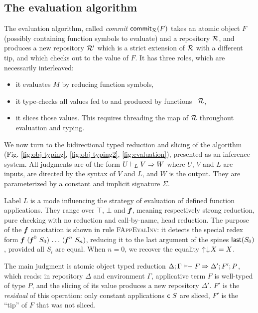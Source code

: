 \documentclass{llncs}
\begin{document}
\subsection{The evaluation algorithm}
\label{sec:eval}

The evaluation algorithm, called \emph{commit}
$\function{commit$_\mr$}{F}$ takes an atomic object $F$ (possibly
containing function symbols to evaluate) and a repository $\mr$, and
produces a new repository $\mr'$ which is a strict extension of $\mr$
with a different tip, and which checks out to the value of $F$. It has
three roles, which are necessarily interleaved:
\begin{itemize}
\item it evaluates $M$ by reducing function symbols,
\item it type-checks all values fed to and produced by functions \wrt\
  $\mr$,
\item it slices those values. This requires threading the map of $\mr$
  throughout evaluation and typing.
\end{itemize}

We now turn to the bidirectional typed reduction and slicing of the
algorithm (Fig. \ref{fig:obj-typing}, \ref{fig:obj-typing2},
\ref{fig:evaluation}), presented as an inference system. All judgments
are of the form $\gjao L U V W$ where $U$, $V$ and $L$ are inputs, are
directed by the syntax of $V$ and $L$, and $W$ is the output. They are
parameterized by a constant and implicit signature $\Sigma$.

Label $L$ is a mode influencing the strategy of evaluation of defined
function applications. They range over $\top$, $\bot$ and $\fct f$,
meaning respectively strong reduction, pure checking with no reduction
and call-by-name, head reduction. The purpose of the $\fct f$
annotation is shown in rule \textsc{FAppEvalInv}: it detects the
special redex form $\app{\fct f}\app {(\app{\fcti f
    0}S_0)}\app\ldots{(\app{\fcti f n} S_n)}$, reducing it to the last
argument of the spines $\function{last}{S_0}$, provided all $S_i$ are
equal. When $n=0$, we recover the equality $\finfer{\fget{X}} = X$.

The main judgment is atomic object typed reduction
$\jf\aeval\Delta\Gamma F {\Delta'} {F'} P$, which reads: in repository
$\Delta$ and environment $\Gamma$, applicative term $F$ is well-typed of
type $P$, and the slicing of its value produces a new repository
$\Delta'$. $F'$ is the \emph{residual} of this operation: only constant
applications $\app{\cst c} S$ are sliced, $F'$ is the ``tip'' of $F$
that was not sliced.
\end{document}
